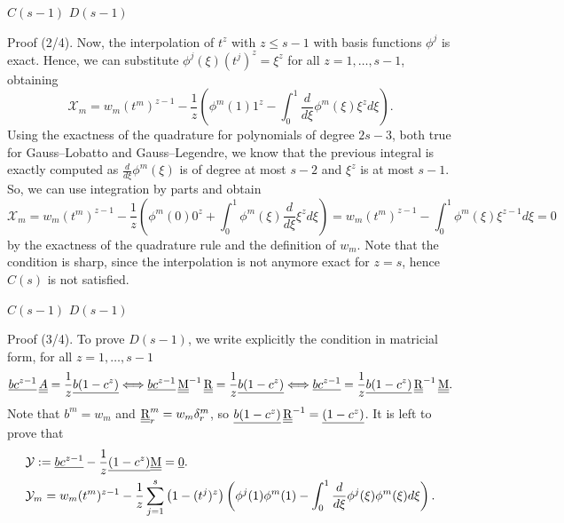\documentclass[9pt,compress,t,aspectratio=169]{beamer}
\begin{document}
\begin{frame}{$C(s-1)$ $D(s-1)$}
	\begin{block}{Proof (2/4).}
		Now, the interpolation of $t^z$ with $z\leq s-1$ with basis functions $\phi^j$ is exact. Hence, we can substitute $\phi^j(\xi)(t^j)^z  = \xi^z$ for all $z=1,\dots, s-1$, obtaining
		\begin{equation*}
			\mathcal{X}_m= w_m (t^{m})^{z-1} - \frac{1}{z} \left( \phi^m (1) 1^z - \int_0^1 \frac{d}{d\xi}\phi^m(\xi)\xi^z  d\xi  \right).
		\end{equation*}
		Using the exactness of the quadrature for polynomials of degree $2s-3$, both true for Gauss--Lobatto and Gauss--Legendre, we know that the previous integral is exactly computed as $\frac{d}{d\xi}\phi^m(\xi)$ is of degree at most $s-2$ and $\xi^z$ is at most $s-1$. So, we can use integration by parts and obtain
		\begin{equation*}
			\mathcal{X}_m= w_m (t^{m})^{z-1} - \frac{1}{z} \left( \phi^m (0) 0^z + \int_0^1 \phi^m(\xi)\frac{d}{d\xi}\xi^z  d\xi  \right) =  w_m (t^{m})^{z-1} - \int_0^1 \phi^m(\xi)\xi^{z-1}  d\xi =0
		\end{equation*}
		by the exactness of the quadrature rule and the definition of $w_m$. Note that the condition is sharp, since the interpolation is not anymore exact for $z=s$, hence $C(s)$ is not satisfied.\\
	\end{block}
\end{frame}

\begin{frame}{$C(s-1)$ $D(s-1)$}
	\begin{block}{Proof (3/4).}
		To prove $D(s-1)$, we write explicitly the condition in matricial form, for all $z=1,\dots, s-1$
			\begin{align*}
				\underline{bc^{z-1}} \, \underline{\underline{A}} = \frac{1}{z} \underline{b(1-c^z)} 
				\Longleftrightarrow \underline{bc^{z-1}} \, \underline{\underline{\mathrm{M}}}^{-1} \, \underline{\underline{\mathrm{R}}} 
				= \frac{1}{z} \underline{b(1-c^z)}
				\Longleftrightarrow \underline{bc^{z-1}}  = \frac{1}{z} \underline{b(1-c^z)}\,
				\underline{\underline{\mathrm{R}}}^{-1}\, \underline{\underline{\mathrm{M}}}.
			\end{align*}
		Note that $b^m=w_m $ and $\underline{\underline{\mathrm{R}}}_r^m = w_m \delta_r^m$, 
		so $\underline{b(1-c^z)}\,\underline{\underline{\mathrm{R}}}^{-1}=\underline{(1-c^z)}$. It is left to prove that
		\begin{align*}
		&	\mathcal{Y}:=\underline{bc^{z-1}}-\frac1z\underline{(1-c^z)}\underline{\underline{\mathrm{M}}} =\underline{0}.\\
		&	\mathcal{Y}_m= w_m (t^m)^{z-1} - \frac1z\sum_{j=1}^s \left(1-(t^j)^z\right) \left(\phi^j(1)\phi^m(1) - \int_0^1 \frac{d}{d\xi}\phi^j(\xi)\phi^m(\xi) d\xi  \right).
		\end{align*}
			\end{block}
\end{frame}
\end{document}
